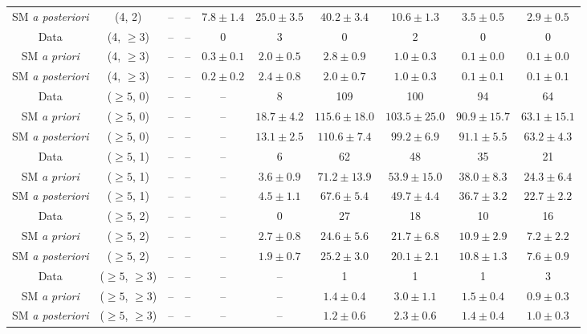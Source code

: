 \begin{table}[h!]
{\begin{tabular}{cccccccccc}
	SM \textit{a posteriori} & (4, 2) & -- & -- & $7.8\pm 1.4$ & $25.0\pm 3.5$ & $40.2\pm 3.4$ & $10.6\pm 1.3$ & $3.5\pm 0.5$ & $2.9\pm 0.5$ \\[0.5ex] 
	Data & (4, $\ge3$) & -- & -- & 0 & 3 & 0 & 2 & 0 & 0 \\[0.5ex] 
	SM \textit{a priori} & (4, $\ge3$) & -- & -- & $0.3\pm 0.1$ & $2.0\pm 0.5$ & $2.8\pm 0.9$ & $1.0\pm 0.3$ & $0.1\pm 0.0$ & $0.1\pm 0.0$ \\[0.5ex] 
	SM \textit{a posteriori} & (4, $\ge3$) & -- & -- & $0.2\pm 0.2$ & $2.4\pm 0.8$ & $2.0\pm 0.7$ & $1.0\pm 0.3$ & $0.1\pm 0.1$ & $0.1\pm 0.1$ \\[0.5ex] 
	Data & ($\ge5$, 0) & -- & -- & -- & 8 & 109 & 100 & 94 & 64 \\[0.5ex] 
	SM \textit{a priori} & ($\ge5$, 0) & -- & -- & -- & $18.7\pm 4.2$ & $115.6\pm 18.0$ & $103.5\pm 25.0$ & $90.9\pm 15.7$ & $63.1\pm 15.1$ \\[0.5ex] 
	SM \textit{a posteriori} & ($\ge5$, 0) & -- & -- & -- & $13.1\pm 2.5$ & $110.6\pm 7.4$ & $99.2\pm 6.9$ & $91.1\pm 5.5$ & $63.2\pm 4.3$ \\[0.5ex] 
	Data & ($\ge5$, 1) & -- & -- & -- & 6 & 62 & 48 & 35 & 21 \\[0.5ex] 
	SM \textit{a priori} & ($\ge5$, 1) & -- & -- & -- & $3.6\pm 0.9$ & $71.2\pm 13.9$ & $53.9\pm 15.0$ & $38.0\pm 8.3$ & $24.3\pm 6.4$ \\[0.5ex] 
	SM \textit{a posteriori} & ($\ge5$, 1) & -- & -- & -- & $4.5\pm 1.1$ & $67.6\pm 5.4$ & $49.7\pm 4.4$ & $36.7\pm 3.2$ & $22.7\pm 2.2$ \\[0.5ex] 
	Data & ($\ge5$, 2) & -- & -- & -- & 0 & 27 & 18 & 10 & 16 \\[0.5ex] 
	SM \textit{a priori} & ($\ge5$, 2) & -- & -- & -- & $2.7\pm 0.8$ & $24.6\pm 5.6$ & $21.7\pm 6.8$ & $10.9\pm 2.9$ & $7.2\pm 2.2$ \\[0.5ex] 
	SM \textit{a posteriori} & ($\ge5$, 2) & -- & -- & -- & $1.9\pm 0.7$ & $25.2\pm 3.0$ & $20.1\pm 2.1$ & $10.8\pm 1.3$ & $7.6\pm 0.9$ \\[0.5ex] 
	Data & ($\ge5$, $\ge3$) & -- & -- & -- & -- & 1 & 1 & 1 & 3 \\[0.5ex] 
	SM \textit{a priori} & ($\ge5$, $\ge3$) & -- & -- & -- & -- & $1.4\pm 0.4$ & $3.0\pm 1.1$ & $1.5\pm 0.4$ & $0.9\pm 0.3$ \\[0.5ex] 
	SM \textit{a posteriori} & ($\ge5$, $\ge3$) & -- & -- & -- & -- & $1.2\pm 0.6$ & $2.3\pm 0.6$ & $1.4\pm 0.4$ & $1.0\pm 0.3$ \\[0.5ex] 
	\hline
	\hline
\end{tabular}}
\end{table}
